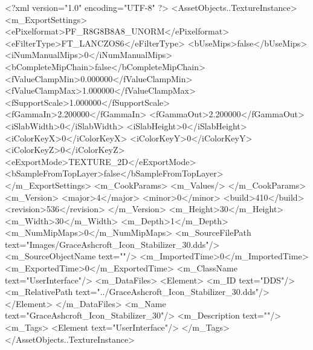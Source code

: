 <?xml version="1.0" encoding="UTF-8" ?>
<AssetObjects..TextureInstance>
	<m_ExportSettings>
		<ePixelformat>PF_R8G8B8A8_UNORM</ePixelformat>
		<eFilterType>FT_LANCZOS6</eFilterType>
		<bUseMips>false</bUseMips>
		<iNumManualMips>0</iNumManualMips>
		<bCompleteMipChain>false</bCompleteMipChain>
		<fValueClampMin>0.000000</fValueClampMin>
		<fValueClampMax>1.000000</fValueClampMax>
		<fSupportScale>1.000000</fSupportScale>
		<fGammaIn>2.200000</fGammaIn>
		<fGammaOut>2.200000</fGammaOut>
		<iSlabWidth>0</iSlabWidth>
		<iSlabHeight>0</iSlabHeight>
		<iColorKeyX>0</iColorKeyX>
		<iColorKeyY>0</iColorKeyY>
		<iColorKeyZ>0</iColorKeyZ>
		<eExportMode>TEXTURE_2D</eExportMode>
		<bSampleFromTopLayer>false</bSampleFromTopLayer>
	</m_ExportSettings>
	<m_CookParams>
		<m_Values/>
	</m_CookParams>
	<m_Version>
		<major>4</major>
		<minor>0</minor>
		<build>410</build>
		<revision>536</revision>
	</m_Version>
	<m_Height>30</m_Height>
	<m_Width>30</m_Width>
	<m_Depth>1</m_Depth>
	<m_NumMipMaps>0</m_NumMipMaps>
	<m_SourceFilePath text="Images/GraceAshcroft_Icon_Stabilizer_30.dds"/>
	<m_SourceObjectName text=""/>
	<m_ImportedTime>0</m_ImportedTime>
	<m_ExportedTime>0</m_ExportedTime>
	<m_ClassName text="UserInterface"/>
	<m_DataFiles>
		<Element>
			<m_ID text="DDS"/>
			<m_RelativePath text="../GraceAshcroft_Icon_Stabilizer_30.dds"/>
		</Element>
	</m_DataFiles>
	<m_Name text="GraceAshcroft_Icon_Stabilizer_30"/>
	<m_Description text=""/>
	<m_Tags>
		<Element text="UserInterface"/>
	</m_Tags>
</AssetObjects..TextureInstance>
